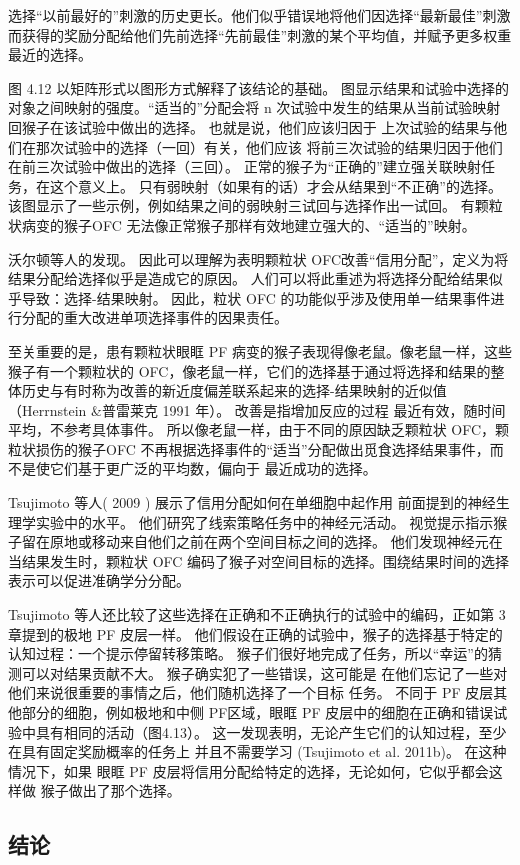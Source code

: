 选择“以前最好的”刺激的历史更长。他们似乎错误地将他们因选择“最新最佳”刺激而获得的奖励分配给他们先前选择“先前最佳”刺激的某个平均值，并赋予更多权重最近的选择。\par
图 4.12 以矩阵形式以图形方式解释了该结论的基础。 图显示结果和试验中选择的对象之间映射的强度。“适当的”分配会将 n 次试验中发生的结果从当前试验映射回猴子在该试验中做出的选择。 也就是说，他们应该归因于
上次试验的结果与他们在那次试验中的选择（一回）有关，他们应该
将前三次试验的结果归因于他们在前三次试验中做出的选择（三回）。 正常的猴子为“正确的”建立强关联映射任务，在这个意义上。 只有弱映射（如果有的话）才会从结果到“不正确”的选择。 该图显示了一些示例，例如结果之间的弱映射三试回与选择作出一试回。 有颗粒状病变的猴子OFC 无法像正常猴子那样有效地建立强大的、“适当的”映射。\par
沃尔顿等人的发现。 因此可以理解为表明颗粒状 OFC改善“信用分配”，定义为将结果分配给选择似乎是造成它的原因。 人们可以将此重述为将选择分配给结果似乎导致：选择-结果映射。 因此，粒状 OFC 的功能似乎涉及使用单一结果事件进行分配的重大改进单项选择事件的因果责任。\par
至关重要的是，患有颗粒状眼眶 PF 病变的猴子表现得像老鼠。像老鼠一样，这些猴子有一个颗粒状的 OFC，像老鼠一样，它们的选择基于通过将选择和结果的整体历史与有时称为改善的新近度偏差联系起来的选择-结果映射的近似值（Herrnstein \&普雷莱克 1991 年）。 改善是指增加反应的过程
最近有效，随时间平均，不参考具体事件。 所以像老鼠一样，由于不同的原因缺乏颗粒状 OFC，颗粒状损伤的猴子OFC 不再根据选择事件的“适当”分配做出觅食选择结果事件，而不是使它们基于更广泛的平均数，偏向于
最近成功的选择。\par
Tsujimoto 等人( 2009 ) 展示了信用分配如何在单细胞中起作用
前面提到的神经生理学实验中的水平。 他们研究了线索策略任务中的神经元活动。 视觉提示指示猴子留在原地或移动来自他们之前在两个空间目标之间的选择。 他们发现神经元在当结果发生时，颗粒状 OFC 编码了猴子对空间目标的选择。围绕结果时间的选择表示可以促进准确学分分配。\par
Tsujimoto 等人还比较了这些选择在正确和不正确执行的试验中的编码，正如第 3 章提到的极地 PF 皮层一样。 他们假设在正确的试验中，猴子的选择基于特定的认知过程：一个提示停留转移策略。 猴子们很好地完成了任务，所以“幸运”的猜测可以对结果贡献不大。 猴子确实犯了一些错误，这可能是
在他们忘记了一些对他们来说很重要的事情之后，他们随机选择了一个目标
任务。 不同于 PF 皮层其他部分的细胞，例如极地和中侧 PF区域，眼眶 PF 皮层中的细胞在正确和错误试验中具有相同的活动（图4.13）。 这一发现表明，无论产生它们的认知过程，至少在具有固定奖励概率的任务上
并且不需要学习 (Tsujimoto et al. 2011b)。 在这种情况下，如果
眼眶 PF 皮层将信用分配给特定的选择，无论如何，它似乎都会这样做
猴子做出了那个选择。\par
\subsection{结论}


